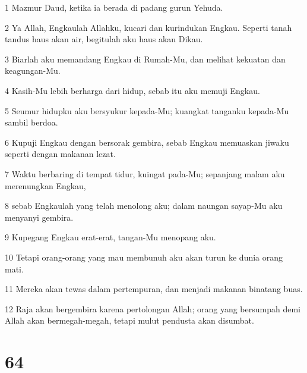 \par 1 Mazmur Daud, ketika ia berada di padang gurun Yehuda.
\par 2 Ya Allah, Engkaulah Allahku, kucari dan kurindukan Engkau. Seperti tanah tandus haus akan air, begitulah aku haus akan Dikau.
\par 3 Biarlah aku memandang Engkau di Rumah-Mu, dan melihat kekuatan dan keagungan-Mu.
\par 4 Kasih-Mu lebih berharga dari hidup, sebab itu aku memuji Engkau.
\par 5 Seumur hidupku aku bersyukur kepada-Mu; kuangkat tanganku kepada-Mu sambil berdoa.
\par 6 Kupuji Engkau dengan bersorak gembira, sebab Engkau memuaskan jiwaku seperti dengan makanan lezat.
\par 7 Waktu berbaring di tempat tidur, kuingat pada-Mu; sepanjang malam aku merenungkan Engkau,
\par 8 sebab Engkaulah yang telah menolong aku; dalam naungan sayap-Mu aku menyanyi gembira.
\par 9 Kupegang Engkau erat-erat, tangan-Mu menopang aku.
\par 10 Tetapi orang-orang yang mau membunuh aku akan turun ke dunia orang mati.
\par 11 Mereka akan tewas dalam pertempuran, dan menjadi makanan binatang buas.
\par 12 Raja akan bergembira karena pertolongan Allah; orang yang bersumpah demi Allah akan bermegah-megah, tetapi mulut pendusta akan disumbat.

\chapter{64}

